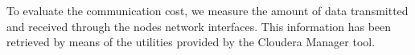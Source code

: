 %
%
%




To evaluate the communication cost, we measure the amount of data transmitted and received
through the nodes network interfaces. This information has been retrieved
by means of the utilities provided by the Cloudera Manager tool.

